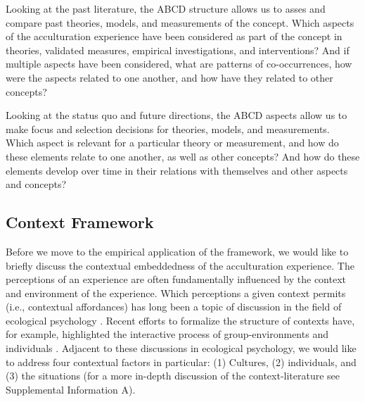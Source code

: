 \documentclass[nobib]{tufte-handout}
\begin{document}
Looking at the past literature, the ABCD structure allows us to asses and compare past theories, models, and measurements of the concept. Which aspects of the acculturation experience have been considered as part of the concept in theories, validated measures, empirical investigations, and interventions? And if multiple aspects have been considered, what are patterns of co-occurrences, how were the aspects related to one another, and how have they related to other concepts?

Looking at the status quo and future directions, the ABCD aspects allow us to make focus and selection decisions for theories, models, and measurements. Which aspect is relevant for a particular theory or measurement, and how do these elements relate to one another, as well as other concepts? And how do these elements develop over time in their relations with themselves and other aspects and concepts?

\subsection{Context Framework}
Before we move to the empirical application of the framework, we would like to briefly discuss the contextual embeddedness of the acculturation experience. 
The perceptions of an experience are often fundamentally influenced by the context and environment of the experience. Which perceptions a given context permits (i.e., contextual affordances) has long been a topic of discussion in the field of ecological psychology \citep[e.g., see][]{Cantor1994}. Recent efforts to formalize the structure of contexts have, for example, highlighted the interactive process of group-environments and individuals \citep[e.g.,][]{Young2002}.
Adjacent to these discussions in ecological psychology, we would like to address four contextual factors in particular: (1) Cultures, (2) individuals, and (3) the situations (for a more in-depth discussion of the context-literature see Supplemental Information A).
\end{document}
